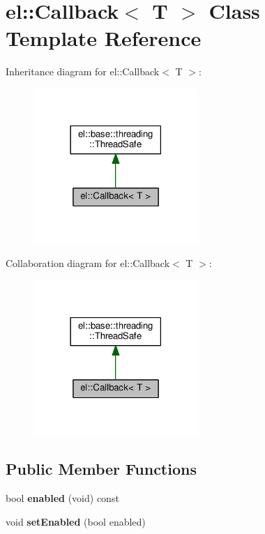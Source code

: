 \hypertarget{classel_1_1_callback}{}\section{el\+:\+:Callback$<$ T $>$ Class Template Reference}
\label{classel_1_1_callback}


Inheritance diagram for el\+:\+:Callback$<$ T $>$\+:
\nopagebreak
\begin{figure}[H]
\begin{center}
\leavevmode
\includegraphics[width=177pt]{classel_1_1_callback__inherit__graph}
\end{center}
\end{figure}


Collaboration diagram for el\+:\+:Callback$<$ T $>$\+:
\nopagebreak
\begin{figure}[H]
\begin{center}
\leavevmode
\includegraphics[width=177pt]{classel_1_1_callback__coll__graph}
\end{center}
\end{figure}
\subsection*{Public Member Functions}
\begin{DoxyCompactItemize}
\item 
\mbox{\label{classel_1_1_callback_aab4afe42d3f4b6282e69e90efdaa8ea7}} 
bool {\bfseries enabled} (void) const
\item 
\mbox{\label{classel_1_1_callback_a05e68cb0b5ea4423913fa2ec4ea306b4}} 
void {\bfseries set\+Enabled} (bool enabled)
\end{DoxyCompactItemize}
